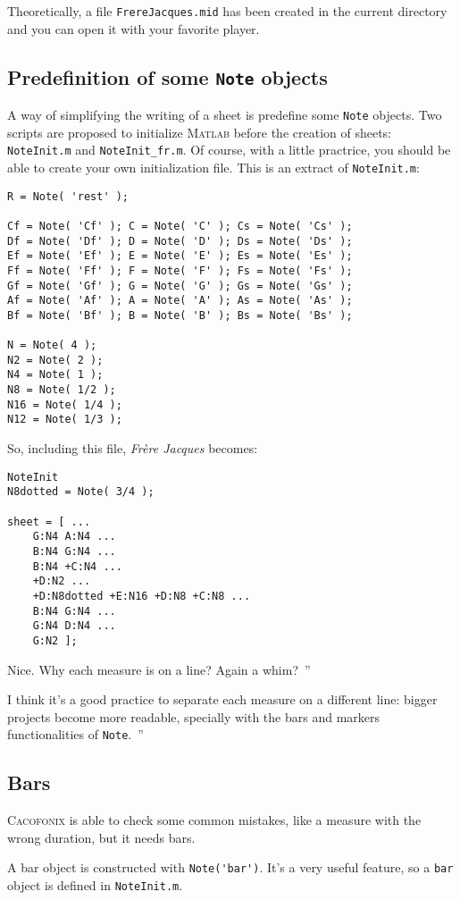 \documentclass{article}
\newcommand{\cacofonix}{\textsc{Cacofonix}\xspace}
\newcommand{\matlab}{\textsc{Matlab}\xspace}
\newcommand{\note}{\lstinline!Note!\xspace}
\newcommand{\frerejaques}{\emph{Fr\`ere Jacques}\xspace}
\newcommand{\file}[1]{\texttt{#1}\xspace}
\newcommand{\noteInitFile}{\file{NoteInit.m}}
\newcommand{\noteInitFrFile}{\file{NoteInit\_fr.m}}
\newenvironment{meenv}{ \par \noindent \makebox[6em][r]{ \textcolor{mecolor}{Me}: `` --~}}{~''}
\newenvironment{myselfenv}{ \par \noindent \makebox[6em][r]{ \textcolor{myselfcolor}{Myself}: `` --~}}{~''}
\newcommand{\me}[1]{\begin{meenv}#1\end{meenv}}
\newcommand{\myself}[1]{\begin{myselfenv}#1\end{myselfenv}}
\begin{document}
Theoretically, a file \file{FrereJacques.mid} has been created in the current directory and you can open it with your favorite player.

\subsection{Predefinition of some \note objects}

A way of simplifying the writing of a sheet is predefine some \note objects. Two scripts are proposed to initialize \matlab before the creation of sheets: \noteInitFile and \noteInitFrFile. Of course, with a little practrice, you should be able to create your own initialization file. This is an extract of \noteInitFile:
\begin{lstlisting}
R = Note( 'rest' );

Cf = Note( 'Cf' ); C = Note( 'C' ); Cs = Note( 'Cs' );
Df = Note( 'Df' ); D = Note( 'D' ); Ds = Note( 'Ds' );
Ef = Note( 'Ef' ); E = Note( 'E' ); Es = Note( 'Es' );
Ff = Note( 'Ff' ); F = Note( 'F' ); Fs = Note( 'Fs' );
Gf = Note( 'Gf' ); G = Note( 'G' ); Gs = Note( 'Gs' );
Af = Note( 'Af' ); A = Note( 'A' ); As = Note( 'As' );
Bf = Note( 'Bf' ); B = Note( 'B' ); Bs = Note( 'Bs' );

N = Note( 4 );
N2 = Note( 2 );
N4 = Note( 1 );
N8 = Note( 1/2 );
N16 = Note( 1/4 );
N12 = Note( 1/3 );
\end{lstlisting}

So, including this file, \frerejaques becomes:
\begin{lstlisting}
NoteInit
N8dotted = Note( 3/4 );

sheet = [ ...
	G:N4 A:N4 ...
	B:N4 G:N4 ...
	B:N4 +C:N4 ...
	+D:N2 ...
	+D:N8dotted +E:N16 +D:N8 +C:N8 ...
	B:N4 G:N4 ...
	G:N4 D:N4 ...
	G:N2 ];
\end{lstlisting}

\me{Nice. Why each measure is on a line? Again a whim?}
\myself{I think it's a good practice to separate each measure on a different line: bigger projects become more readable, specially with the bars and markers functionalities of \note.}

\subsection{Bars}

\cacofonix is able to check some common mistakes, like a measure with the wrong duration, but it needs bars.

A bar object is constructed with \lstinline!Note('bar')!. It's a very useful feature, so a \lstinline!bar! object is defined in \noteInitFile.
\end{document}

